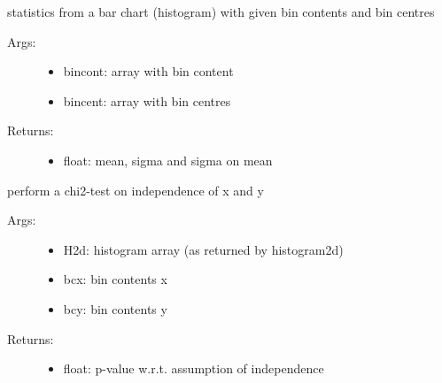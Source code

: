 \documentclass[letterpaper,10pt,english]{sphinxmanual}
\begin{document}

\begin{fulllineitems}
\label{\detokenize{index:PhyPraKit.PhyPraKit.barstat}}
statistics from a bar chart (histogram) 
with given bin contents and bin centres
\begin{description}
\item[{Args:}] \leavevmode\begin{itemize}
\item {} 
bincont: array with bin content

\item {} 
bincent: array with bin centres

\end{itemize}

\item[{Returns:}] \leavevmode\begin{itemize}
\item {} 
float: mean, sigma and sigma on mean

\end{itemize}

\end{description}

\end{fulllineitems}


\begin{fulllineitems}
\label{\detokenize{index:PhyPraKit.PhyPraKit.chi2p_indep2d}}
perform a chi2-test on independence of x and y
\begin{description}
\item[{Args:}] \leavevmode\begin{itemize}
\item {} 
H2d: histogram array (as returned by histogram2d)

\item {} 
bcx: bin contents x

\item {} 
bcy: bin contents y

\end{itemize}

\item[{Returns:}] \leavevmode\begin{itemize}
\item {} 
float: p-value w.r.t. assumption of independence

\end{itemize}

\end{description}

\end{fulllineitems}
\end{document}
